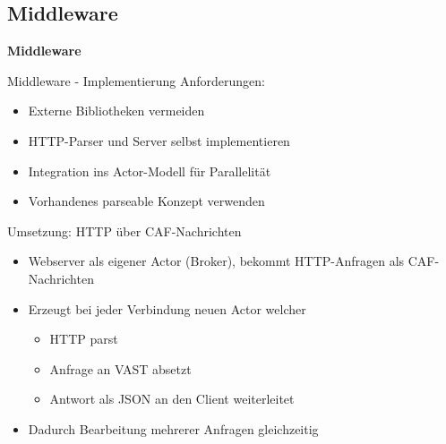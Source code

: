 \documentclass[9pt]{beamer}
\begin{document}
\subsection{Middleware}

	\begin{frame}{}
		\begin{center}
			\LARGE \textbf{Middleware}
		\end{center}
	\end{frame}

\begin{frame}{Middleware - Implementierung}{}
	Anforderungen:
	\begin{itemize}
		\item Externe Bibliotheken vermeiden
		\item HTTP-Parser und Server selbst implementieren
		\item Integration ins Actor-Modell für Parallelität
		\item Vorhandenes parseable Konzept verwenden
	\end{itemize}
	Umsetzung: HTTP über CAF-Nachrichten
	\begin{itemize}
        \item Webserver als eigener Actor (Broker), bekommt HTTP-Anfragen als CAF-Nachrichten
		\item Erzeugt bei jeder Verbindung neuen Actor welcher
            \begin{itemize}
                \item HTTP parst
                \item Anfrage an VAST absetzt
                \item Antwort als JSON an den Client weiterleitet
            \end{itemize}
		\item Dadurch Bearbeitung mehrerer Anfragen gleichzeitig
	\end{itemize}
\end{frame}
\end{document}
